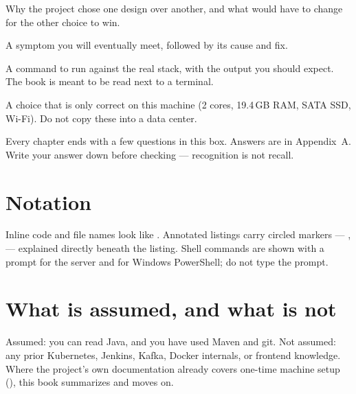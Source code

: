 \begin{decision}[example]
Why the project chose one design over another, and what would have to
change for the other choice to win.
\end{decision}

\begin{pitfall}[example]
A symptom you will eventually meet, followed by its cause and fix.
\end{pitfall}

\begin{handson}[example]
A command to run against the real stack, with the output you should
expect. The book is meant to be read next to a terminal.
\end{handson}

\begin{hardware}[example]
A choice that is only correct on this machine (2 cores, 19.4\,GB RAM,
SATA SSD, Wi-Fi). Do not copy these into a data center.
\end{hardware}

\begin{quiz}
Every chapter ends with a few questions in this box. Answers are in
Appendix~A. Write your answer down before checking --- recognition is not
recall.
\end{quiz}

\section*{Notation}

Inline code and file names look like . Annotated
listings carry circled markers --- ,  --- explained directly
beneath the listing. Shell commands are shown with a \code{\$} prompt for
the server and  for Windows PowerShell; do not type the prompt.

\section*{What is assumed, and what is not}

Assumed: you can read Java, and you have used Maven and git. Not assumed:
any prior Kubernetes, Jenkins, Kafka, Docker internals, or frontend
knowledge. Where the project's own documentation already covers one-time
machine setup (), this book summarizes
and moves on.
